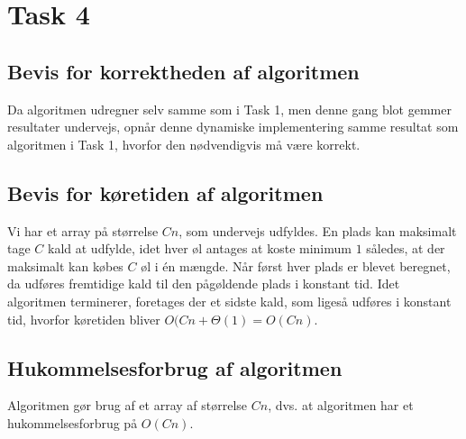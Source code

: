 \section{Task 4}
\subsection{Bevis for korrektheden af algoritmen}

Da algoritmen udregner selv samme som i Task 1, men denne gang blot gemmer resultater undervejs, opnår denne dynamiske implementering samme resultat som algoritmen i Task 1, hvorfor den nødvendigvis må være korrekt. 

\subsection{Bevis for køretiden af algoritmen}

Vi har et array på størrelse $Cn$, som undervejs udfyldes.
En plads kan maksimalt tage $C$ kald at udfylde, idet hver øl antages at koste minimum $1$ således, at der maksimalt kan købes $C$ øl i én mængde. 
Når først hver plads er blevet beregnet, da udføres fremtidige kald til den pågøldende plads i konstant tid. Idet algoritmen terminerer, foretages der et sidste kald, som ligeså udføres i konstant tid, hvorfor køretiden bliver $O(Cn+\Theta(1) = O(Cn)$.

\subsection{Hukommelsesforbrug af algoritmen}
Algoritmen gør brug af et array af størrelse $Cn$, dvs.
at algoritmen har et hukommelsesforbrug på $O(Cn)$.

